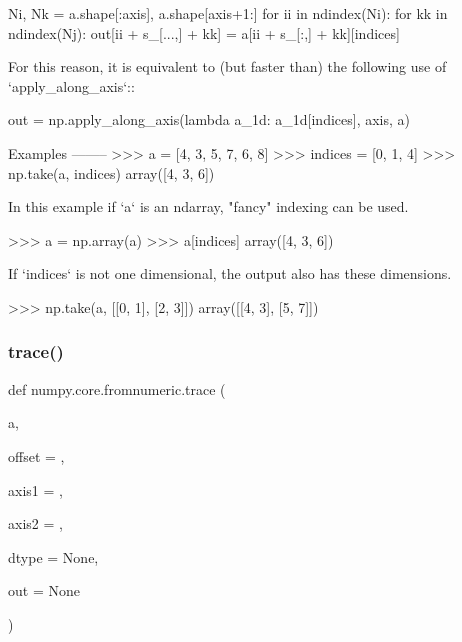 \begin{DoxyVerb}
    Ni, Nk = a.shape[:axis], a.shape[axis+1:]
    for ii in ndindex(Ni):
        for kk in ndindex(Nj):
            out[ii + s_[...,] + kk] = a[ii + s_[:,] + kk][indices]

For this reason, it is equivalent to (but faster than) the following use
of `apply_along_axis`::

    out = np.apply_along_axis(lambda a_1d: a_1d[indices], axis, a)

Examples
--------
>>> a = [4, 3, 5, 7, 6, 8]
>>> indices = [0, 1, 4]
>>> np.take(a, indices)
array([4, 3, 6])

In this example if `a` is an ndarray, "fancy" indexing can be used.

>>> a = np.array(a)
>>> a[indices]
array([4, 3, 6])

If `indices` is not one dimensional, the output also has these dimensions.

>>> np.take(a, [[0, 1], [2, 3]])
array([[4, 3],
       [5, 7]])
\end{DoxyVerb}
 \mbox{\label{namespacenumpy_1_1core_1_1fromnumeric_a6ebb716a5ba069db3ad26a49e1789712}} 
\subsubsection{\texorpdfstring{trace()}{trace()}}
{\footnotesize\ttfamily def numpy.\+core.\+fromnumeric.\+trace (\begin{DoxyParamCaption}\item[{}]{a,  }\item[{}]{offset = {},  }\item[{}]{axis1 = {},  }\item[{}]{axis2 = {},  }\item[{}]{dtype = {\ttfamily None},  }\item[{}]{out = {\ttfamily None} }\end{DoxyParamCaption})}


